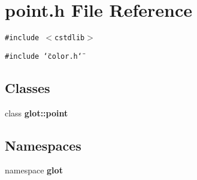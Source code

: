 \section{point.h File Reference}
\label{point_8h}
{\tt \#include $<$cstdlib$>$}\par
{\tt \#include \char`\"{}color.h\char`\"{}}\par
\subsection*{Classes}
\begin{CompactItemize}
\item 
class {\bf glot::point}
\end{CompactItemize}
\subsection*{Namespaces}
\begin{CompactItemize}
\item 
namespace {\bf glot}
\end{CompactItemize}
